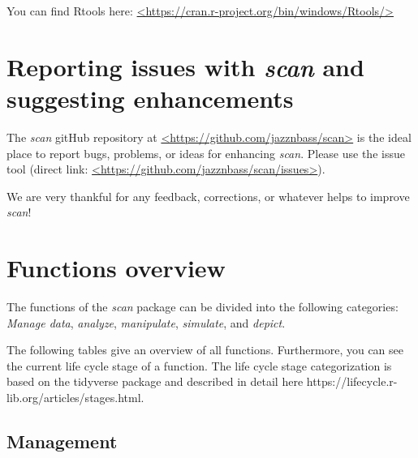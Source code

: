 \documentclass[
  letterpaper,
  DIV=11,
  numbers=noendperiod]{scrreprt}
\begin{document}
You can find Rtools here:
\href{https://cran.r-project.org/bin/windows/Rtools/}{\textless https://cran.r-project.org/bin/windows/Rtools/\textgreater{}}

\hypertarget{reporting-issues-with-scan-and-suggesting-enhancements}{%
\section{\texorpdfstring{Reporting issues with \emph{scan} and
suggesting
enhancements}{Reporting issues with scan and suggesting enhancements}}\label{reporting-issues-with-scan-and-suggesting-enhancements}}

The \emph{scan} gitHub repository at
\href{https://github.com/jazznbass/scan}{\textless https://github.com/jazznbass/scan\textgreater{}}
is the ideal place to report bugs, problems, or ideas for enhancing
\emph{scan}. Please use the issue tool (direct link:
\href{https://github.com/jazznbass/scan/issues}{\textless https://github.com/jazznbass/scan/issues\textgreater{}}).

We are very thankful for any feedback, corrections, or whatever helps to
improve \emph{scan}!

\hypertarget{functions-overview}{%
\section{Functions overview}\label{functions-overview}}

The functions of the \emph{scan} package can be divided into the
following categories:\\
\emph{Manage data}, \emph{analyze}, \emph{manipulate}, \emph{simulate},
and \emph{depict}.

The following tables give an overview of all functions. Furthermore, you
can see the current life cycle stage of a function. The life cycle stage
categorization is based on the tidyverse package and described in detail
here https://lifecycle.r-lib.org/articles/stages.html.

\hypertarget{management}{%
\subsection{Management}\label{management}}
\end{document}
